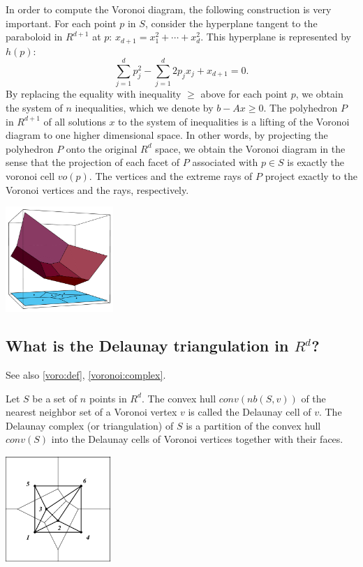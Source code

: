 \documentclass[[a4paper,12pt]{article}
\begin{document}
In order to compute the Voronoi diagram, the following construction
is very important.  For each point $p$ in $S$, consider
the hyperplane tangent to the paraboloid in $R^{d+1}$ at $p$: 
$x_{d+1} = x_1^2 + \cdots + x_d^2$.  This hyperplane is 
represented by $h(p)$: 
\[
\sum_{j=1}^d p_j^2 - \sum_{j=1}^d 2 p_j x_j + x_{d+1} = 0.
\]
By replacing the equality with inequality $\ge$ above for each point $p$,
we obtain the system of $n$ inequalities, which we denote by  
$b - A x \ge 0$.  The polyhedron $P$ in $R^{d+1}$ of all solutions
$x$ to the system of inequalities is a lifting of the Voronoi diagram
to one higher dimensional space.  In other words, by projecting
the polyhedron $P$ onto the original $R^d$ space, we obtain
the Voronoi diagram in the sense that the projection of each facet of $P$
associated with $p \in S$ is exactly the voronoi cell $vo(p)$.
The vertices and the extreme rays of $P$ project exactly to
the Voronoi vertices and the rays, respectively.

\bigskip
\begin{center}
\includegraphics[height=40mm]{vtest_fig_vo3d}
\end{center}

\subsection{What is the Delaunay triangulation in $R^d$? }
\label{voro:dela_def}

See also \ref{voro:def}, \ref{voronoi:complex}.

Let $S$ be a set of $n$ points in $R^d$. 
The convex hull $conv(nb(S, v))$ of the nearest neighbor set of a
Voronoi vertex $v$ is called the Delaunay cell of $v$. 
The Delaunay complex (or triangulation) of $S$
is a partition of the convex hull $conv(S)$ into 
the Delaunay cells of Voronoi vertices together with
their faces.

\bigskip
\begin{center}
\includegraphics[height=40mm]{vtest_draw_vode}
\end{center}
\end{document}
